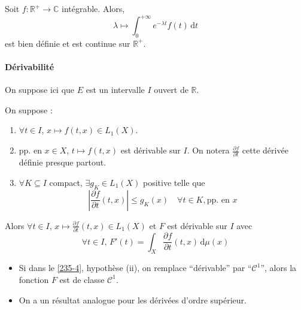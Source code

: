
  \begin{example}
    Soit $f : \mathbb{R}^+ \rightarrow \mathbb{C}$ intégrable. Alors,
    \[ \lambda \mapsto \int_0^{+\infty} e^{-\lambda t} f(t) \, \mathrm{d}t \]
    est bien définie et est continue sur $\mathbb{R}^+$.
  \end{example}

  \paragraph{Dérivabilité}


  On suppose ici que $E$ est un intervalle $I$ ouvert de $\mathbb{R}$.

  \begin{theorem}
    \label{235-4}
    On suppose :
    \begin{enumerate}[label={\bfseries(\roman*)}]
      \item $\forall t \in I$, $x \mapsto f(t,x) \in L_1(X)$.
      \item pp. en $x \in X$, $t \mapsto f(t,x)$ est dérivable sur $I$. On notera $\frac{\partial f}{\partial t}$ cette dérivée définie presque partout.
      \item $\forall K \subseteq I$ compact, $\exists g_K \in L_1(X)$ positive telle que
      \[ \left| \frac{\partial f}{\partial t}(t,x) \right| \leq g_K(x) \quad \forall t \in K, \text{pp. en } x \]
    \end{enumerate}
    Alors $\forall t \in I$, $x \mapsto \frac{\partial f}{\partial t}(t, x) \in L_1(X)$ et $F$ est dérivable sur $I$ avec
    \[ \forall t \in I, \, F'(t) = \int_X \frac{\partial f}{\partial t}(t, x) \, \mathrm{d}\mu(x) \]
  \end{theorem}

  \begin{remark}
    \begin{itemize}
      \item Si dans le \cref{235-4}, hypothèse (ii), on remplace ``dérivable'' par ``$\mathcal{C}^1$'', alors la fonction $F$ est de classe $\mathcal{C}^1$.
      \item On a un résultat analogue pour les dérivées d'ordre supérieur.
    \end{itemize}
  \end{remark}

